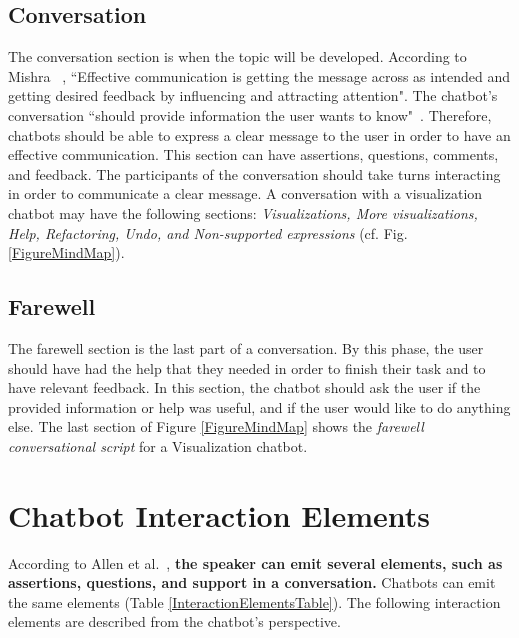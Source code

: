 \documentclass[a4paper,10pt]{article}
\begin{document}
\subsection{Conversation}
The conversation section is when the topic will be developed. According to Mishra ~\cite{effectivCommunication}, ``Effective communication is getting the message across as intended and getting desired feedback by influencing and attracting attention". The chatbot's conversation ``should provide information the user wants to know"~\cite{HowChatbotsCanHelpUsers}. Therefore, chatbots should be able to express a clear message to the user in order to have an effective communication. This section can have assertions, questions, comments, and feedback. The participants of the conversation should take turns interacting in order to communicate a clear message. A conversation with a visualization chatbot may have the following sections: \textit{Visualizations, More visualizations, Help, Refactoring, Undo, and Non-supported expressions} (cf. Fig. \ref{FigureMindMap}).

\subsection{Farewell}
The farewell section is the last part of a conversation. By this phase, the user should have had the help that they needed in order to finish their task and to have relevant feedback. In this section, the chatbot should ask the user if the provided information or help was useful, and if the user would like to do anything else. The last section of Figure \ref{FigureMindMap} shows the \textit{farewell conversational script} for a Visualization chatbot. 

\section{Chatbot Interaction Elements}
According to Allen et al.~\cite{allen1978conversation}, \textbf{the speaker can emit several elements, such as assertions, questions, and support in a conversation.} Chatbots can emit the same elements (Table \ref{InteractionElementsTable}). The following interaction elements are described from the chatbot's perspective. 

\end{document}
